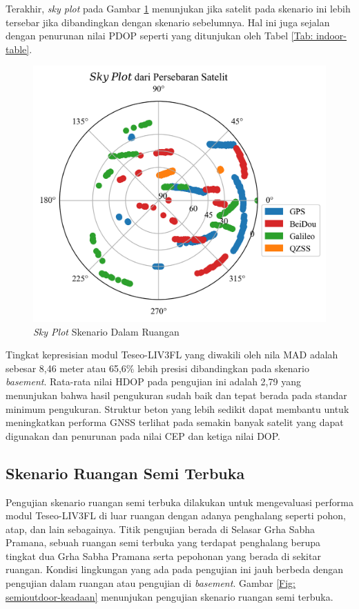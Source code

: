 Terakhir, \textit{sky plot} pada Gambar \ref{Fig: indoor-sky_plot} menunjukan jika satelit pada skenario ini lebih tersebar jika dibandingkan dengan skenario sebelumnya. Hal ini juga sejalan dengan penurunan nilai PDOP seperti yang ditunjukan oleh Tabel \ref{Tab: indoor-table}.

\begin{figure}[H]
	\centering
	\captionsetup{justification=centering}
	\includegraphics[width=12cm]{contents/chapter-4/2-skenario-indoor/sky_plot.png}
	\caption{\textit{Sky Plot} Skenario Dalam Ruangan}
	\label{Fig: indoor-sky_plot}
\end{figure}

Tingkat kepresisian modul Teseo-LIV3FL yang diwakili oleh nila MAD adalah sebesar 8,46 meter atau 65,6\% lebih presisi dibandingkan pada skenario \textit{basement}. Rata-rata nilai HDOP pada pengujian ini adalah 2,79 yang menunjukan bahwa hasil pengukuran sudah baik dan tepat berada pada standar minimum pengukuran. Struktur beton yang lebih sedikit dapat membantu untuk meningkatkan performa GNSS terlihat pada semakin banyak satelit yang dapat digunakan dan penurunan pada nilai CEP dan ketiga nilai DOP.

\subsection{Skenario Ruangan Semi Terbuka}
Pengujian skenario ruangan semi terbuka dilakukan untuk mengevaluasi performa modul Teseo-LIV3FL di luar ruangan dengan adanya penghalang seperti pohon, atap, dan lain sebagainya. Titik pengujian berada di Selasar Grha Sabha Pramana, sebuah ruangan semi terbuka yang terdapat penghalang berupa tingkat dua Grha Sabha Pramana serta pepohonan yang berada di sekitar ruangan. Kondisi lingkungan yang ada pada pengujian ini jauh berbeda dengan pengujian dalam ruangan atau pengujian di \textit{basement}. Gambar \ref{Fig: semioutdoor-keadaan} menunjukan pengujian skenario ruangan semi terbuka.

